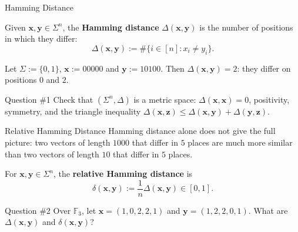 \documentclass{zkdl-presentation-template}
\begin{document}
    \begin{frame}{Hamming Distance}
        \begin{definition}
            Given $\mathbf{x}, \mathbf{y} \in \Sigma^n$, the \textbf{Hamming distance} $\Delta(\mathbf{x}, \mathbf{y})$ is the number of positions in which they differ:
            \begin{equation*}
                \Delta(\mathbf{x}, \mathbf{y}) := \#\{i \in [n]: x_i \neq y_i\}.
            \end{equation*}
        \end{definition}
        \pause

        \begin{example}
            Let $\Sigma := \{0,1\}$, $\mathbf{x} := 00000$ and $\mathbf{y} := 10100$. Then $\Delta(\mathbf{x}, \mathbf{y}) = 2$: they differ on positions $0$ and $2$.
        \end{example}
        \pause

        \begin{questionblock}{Question \#1}
            Check that $(\Sigma^n,\Delta)$ is a metric space: $\Delta(\mathbf{x},\mathbf{x}) = 0$, positivity, symmetry, and the triangle inequality $\Delta(\mathbf{x},\mathbf{z}) \leq \Delta(\mathbf{x},\mathbf{y}) + \Delta(\mathbf{y},\mathbf{z})$.
        \end{questionblock}
    \end{frame}

    \begin{frame}{Relative Hamming Distance}
        Hamming distance alone does not give the full picture: two vectors of length $1000$ that differ in $5$ places are much more similar than two vectors of length $10$ that differ in $5$ places.
        \pause

        \begin{definition}
            For $\mathbf{x}, \mathbf{y} \in \Sigma^n$, the \textbf{relative Hamming distance} is
            \begin{equation*}
                \delta(\mathbf{x}, \mathbf{y}) := \frac{1}{n} \Delta(\mathbf{x}, \mathbf{y}) \in [0,1].
            \end{equation*}
        \end{definition}
        \pause

        \begin{questionblock}{Question \#2}
            Over $\mathbb{F}_3$, let $\mathbf{x} = (1,0,2,2,1)$ and $\mathbf{y} = (1,2,2,0,1)$. What are $\Delta(\mathbf{x},\mathbf{y})$ and $\delta(\mathbf{x},\mathbf{y})$?
        \end{questionblock}
    \end{frame}
\end{document}
